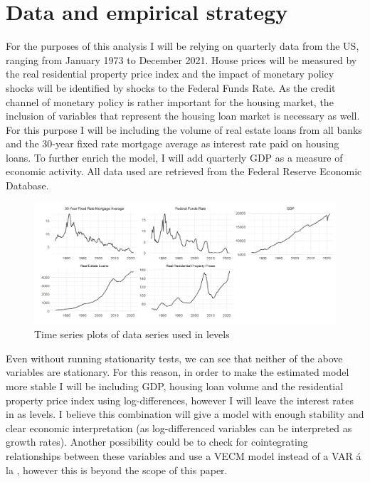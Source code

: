 \documentclass[12pt,a4paper]{article}
\begin{document}
\section{Data and empirical strategy}
For the purposes of this analysis I will be relying on quarterly data from the US, ranging from January 1973 to December 2021. House prices will be measured by the real residential property price index and the impact of monetary policy shocks will be identified by shocks to the Federal Funds Rate. As the credit channel of monetary policy is rather important for the housing market, the inclusion of variables that represent the housing loan market is necessary as well. For this purpose I will be including the volume of real estate loans from all banks and the 30-year fixed rate mortgage average as interest rate paid on housing loans. To further enrich the model, I will add quarterly GDP as a measure of economic activity. All data used are retrieved from the Federal Reserve Economic Database.
 \begin{center}
	\begin{figure}[h!]
			\includegraphics[width = \textwidth]{dataplot.png}
			\caption{Time series plots of data series used in levels}
	\end{figure}
\end{center}
Even without running stationarity tests, we can see that neither of the above variables are stationary. For this reason, in order to make the estimated model more stable I will be including GDP, housing loan volume and the residential property price index using log-differences, however I will leave the interest rates in as levels. I believe this combination will give a model with enough stability and clear economic interpretation (as log-differenced variables can be interpreted as growth rates). Another possibility could be to check for cointegrating relationships between these variables and use a VECM model instead of a VAR á la \textcolor{blue}{\cite{iacoviello2008credit}}, however this is beyond the scope of this paper.\\
\end{document}
